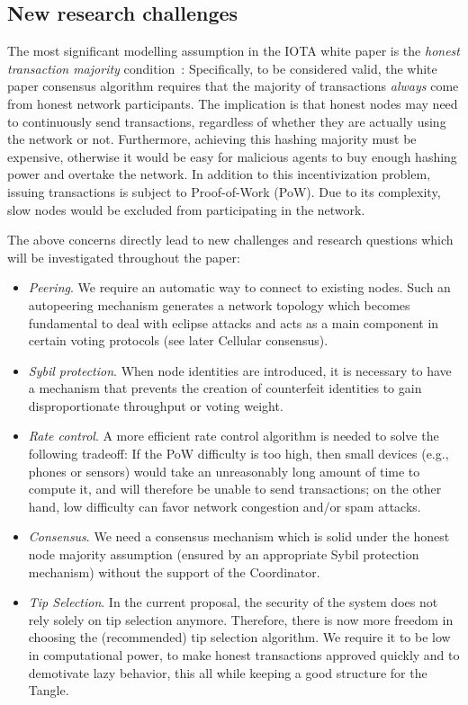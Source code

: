 \documentclass[../main.tex]{subfiles}
\begin{document}
\subsection{New research challenges}\label{sec:cliri_limitations}
	The most significant modelling assumption in the IOTA white paper is the \textit{honest transaction majority} condition~\cite{bramas2019}: Specifically, to be considered valid, the white paper consensus algorithm requires that the majority of transactions \textit{always} come from honest network participants. The implication is that honest nodes may need to continuously send transactions, regardless of whether they are actually using the network or not. Furthermore, achieving this hashing majority must be expensive, otherwise it would be easy for malicious agents to buy enough hashing power and overtake the network. In addition to this incentivization problem, issuing transactions is subject to Proof-of-Work (PoW). Due to its complexity, slow nodes would be excluded from participating in the network.
	
	The above concerns directly lead to new challenges and research questions which will be investigated throughout the paper:
	
	\begin{itemize}
	    \item \textit{Peering}. We require an automatic way to connect to existing nodes. Such an autopeering mechanism generates a network topology which becomes fundamental to deal with eclipse attacks and acts as a main component in certain voting protocols (see later Cellular consensus).
	    
	    \item \textit{Sybil protection}. When node identities are introduced, it is necessary to have a mechanism that prevents the creation of counterfeit identities to gain disproportionate throughput or voting weight.
	    
		\item \textit{Rate control}. A more efficient rate control algorithm is needed to solve the following tradeoff: If the PoW difficulty is too high, then small devices (e.g., phones or sensors) would take an unreasonably long amount of time to compute it, and will therefore be unable to send transactions; on the other hand, low difficulty can favor network congestion and/or spam attacks.
		
		\item \textit{Consensus}. We need a consensus mechanism which is solid under 
		the honest node majority assumption (ensured by an appropriate
		Sybil protection mechanism) without the support of the Coordinator.
		
		\item \textit{Tip Selection}. 
		In the current proposal, the security of the system does not 
		rely solely on tip selection anymore.
		Therefore, there is now more freedom in choosing the 
		(recommended) tip selection algorithm. 
		We require it to be low in computational power, to make honest transactions approved quickly and to demotivate lazy behavior, this all while keeping a good structure for the Tangle.
	\end{itemize}
	
\end{document}
